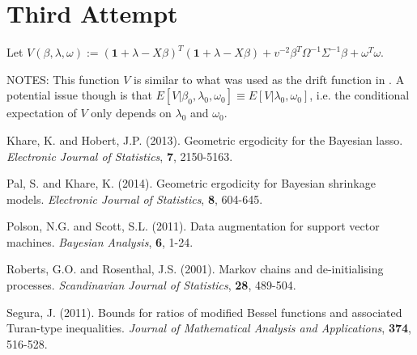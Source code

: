 \documentclass[12pt]{article}
\begin{document}
\section{Third Attempt}

Let $V(\beta, \lambda, \omega) := (\bm{1} + \lambda - X\beta)^T (\bm{1} + \lambda - X\beta) + v^{-2} \beta^T \Omega^{-1}\Sigma^{-1}\beta +
\omega^T \omega$.

NOTES: This function $V$ is similar to what was used as the drift function in \cite{lasso}. A potential issue though is that $E[V|\beta_0,
\lambda_0, \omega_0] \equiv E[V| \lambda_0, \omega_0]$, i.e. the conditional expectation of $V$ only depends on $\lambda_0$ and $\omega_0$.

\newpage

\begin{thebibliography}{9}
    Khare, K. and Hobert, J.P. (2013). Geometric ergodicity for the Bayesian lasso. \emph{Electronic Journal of Statistics}, \textbf{7}, 2150-5163.

    Pal, S. and Khare, K. (2014). Geometric ergodicity for Bayesian shrinkage models. \emph{Electronic Journal of Statistics}, \textbf{8}, 604-645.

    Polson, N.G. and Scott, S.L. (2011). Data augmentation for support vector machines. \emph{Bayesian Analysis}, \textbf{6}, 1-24.

    Roberts, G.O. and Rosenthal, J.S. (2001). Markov chains and de-initialising processes. \emph{Scandinavian Journal of Statistics}, \textbf{28},
    489-504.

    Segura, J. (2011). Bounds for ratios of modified Bessel functions and associated Turan-type inequalities. \emph{Journal of Mathematical Analysis
    and Applications}, \textbf{374}, 516-528.
\end{thebibliography}
\end{document}
